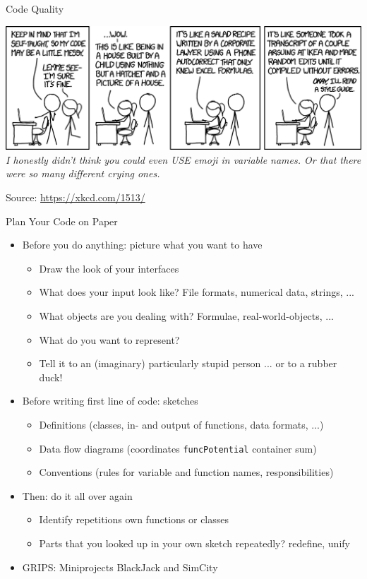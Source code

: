\begin{frame}{Code Quality}
%
\begin{center}
	\includegraphics[width=\linewidth]{./gfx/xkcd-codeQuality}\\
	\emph{I honestly didn't think you could even USE emoji in variable names. Or that there were so many different crying ones.}

	\vspace{6pt}
	Source: \url{https://xkcd.com/1513/}
\end{center}
%
\end{frame}


\begin{frame}{Plan Your Code on Paper}
%
\begin{itemize}
\item Before you do anything: picture what you want to have
	\begin{itemize}
	\item Draw the look of your interfaces
	\item What does your input look like? File formats, numerical data, strings, ...
	\item What objects are you dealing with? Formulae, real-world-objects, ...
	\item What do you want to represent?
	\item Tell it to an (imaginary) particularly stupid person ... or to a rubber duck!
	\end{itemize}
\item Before writing first line of code: sketches
	\begin{itemize}
	\item Definitions (classes, in- and output of functions, data formats, ...)
	\item Data flow diagrams (\eg coordinates \thus\; \texttt{funcPotential} \thus\; container \thus\; sum)
	\item Conventions (rules for variable and function names, responsibilities)
	\end{itemize}
\item Then: do it all over again
	\begin{itemize}
	\item Identify repetitions \thus\; own functions or classes
	\item Parts that you looked up in your own sketch repeatedly? \thus\; redefine, unify
	\end{itemize}
\item GRIPS: Miniprojects BlackJack and SimCity
\end{itemize}
%
\end{frame}

